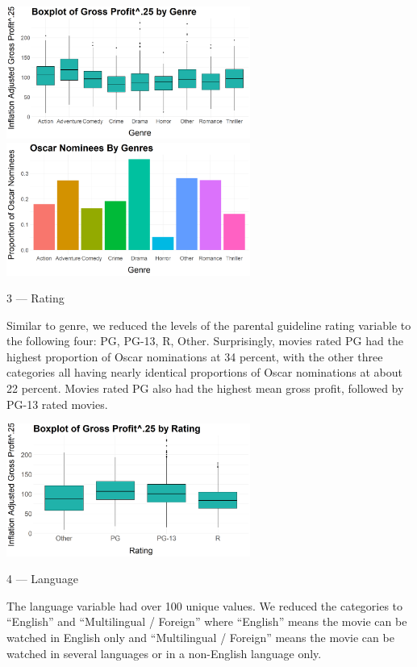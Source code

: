 \documentclass[10pt]{article}
\begin{document}
\begin{center}
\includegraphics[width=8cm]{_assets/_eda/genre_iagp_bp.png}
\hspace{1cm}
\includegraphics[width=8cm]{_assets/_eda/on_by_genre.png}

\end{center}

3 --- Rating

Similar to genre, we reduced the levels of the parental guideline rating variable to the following four: PG, PG-13, R, Other. Surprisingly, movies rated PG had the highest proportion of Oscar nominations at 34 percent, with the other three categories all having nearly identical proportions of Oscar nominations at about 22 percent. Movies rated PG also had the highest mean gross profit, followed by PG-13 rated movies. 

\begin{center}
\includegraphics[width=8cm]{_assets/_eda/rating_iagp_bp.png}

\end{center}

4 --- Language

The language variable had over 100 unique values. We reduced the categories to “English” and “Multilingual / Foreign” where “English” means the movie can be watched in English only and “Multilingual / Foreign” means the movie can be watched in several languages or in a non-English language only.
\end{document}
